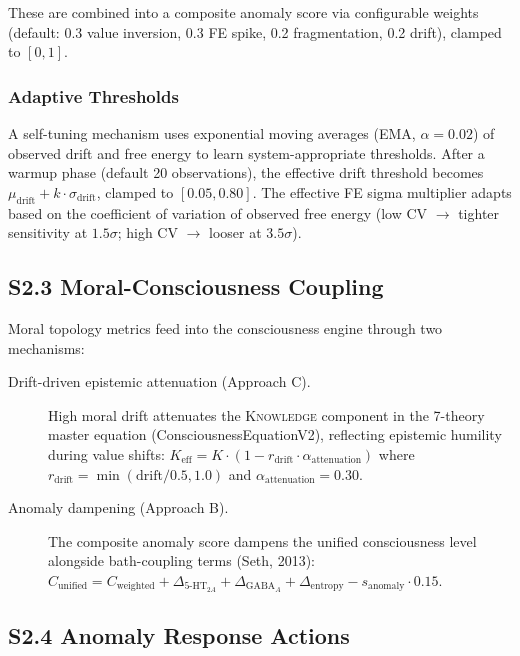 \documentclass[10pt,landscape]{article}
\begin{document}
These are combined into a composite anomaly score via configurable weights (default: 0.3 value inversion, 0.3 FE spike, 0.2 fragmentation, 0.2 drift), clamped to $[0, 1]$.

\subsubsection*{Adaptive Thresholds}

A self-tuning mechanism uses exponential moving averages (EMA, $\alpha = 0.02$) of observed drift and free energy to learn system-appropriate thresholds.  After a warmup phase (default 20 observations), the effective drift threshold becomes $\mu_{\mathrm{drift}} + k \cdot \sigma_{\mathrm{drift}}$, clamped to $[0.05, 0.80]$.  The effective FE sigma multiplier adapts based on the coefficient of variation of observed free energy (low CV $\to$ tighter sensitivity at $1.5\sigma$; high CV $\to$ looser at $3.5\sigma$).

\subsection*{S2.3 Moral-Consciousness Coupling}

Moral topology metrics feed into the consciousness engine through two mechanisms:

\begin{description}
  \item[Drift-driven epistemic attenuation (Approach C).] High moral drift attenuates the \textsc{Knowledge} component in the 7-theory master equation (ConsciousnessEquationV2), reflecting epistemic humility during value shifts: $K_{\mathrm{eff}} = K \cdot (1 - r_{\mathrm{drift}} \cdot \alpha_{\mathrm{attenuation}})$ where $r_{\mathrm{drift}} = \min(\mathrm{drift} / 0.5, 1.0)$ and $\alpha_{\mathrm{attenuation}} = 0.30$.
  \item[Anomaly dampening (Approach B).] The composite anomaly score dampens the unified consciousness level alongside bath-coupling terms (Seth, 2013): $C_{\mathrm{unified}} = C_{\mathrm{weighted}} + \Delta_{5\text{-HT}_{2A}} + \Delta_{\mathrm{GABA}_A} + \Delta_{\mathrm{entropy}} - s_{\mathrm{anomaly}} \cdot 0.15$.
\end{description}

\subsection*{S2.4 Anomaly Response Actions}
\end{document}
